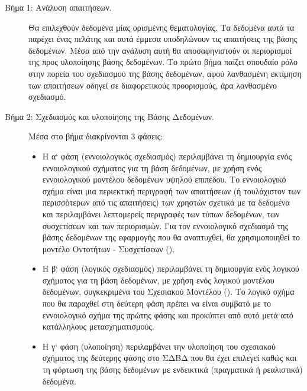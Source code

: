 \documentclass{assignment}
\begin{document}
\begin{description}

  \item [Βήμα 1: Ανάλυση απαιτήσεων.]  Θα επιλεχθούν δεδομένα μίας ορισμένης θεματολογίας. Τα δεδομένα αυτά τα παρέχει ένας πελάτης και αυτά έμμεσα υποδηλώνουν τις απαιτήσεις της βάσης δεδομένων. Μέσα από την ανάλυση αυτή θα αποσαφηνιστούν οι περιορισμοί της προς υλοποίησης βάσης δεδομένων. Το πρώτο βήμα παίζει σπουδαίο ρόλο στην πορεία του σχεδιασμού της βάσης δεδομένων, αφού λανθασμένη εκτίμηση των απαιτήσεων οδηγεί σε διαφορετικούς προορισμούς, άρα λανθασμένο σχεδιασμό. 

  \item [Βήμα 2: Σχεδιασμός και υλοποίησης της Βάσης Δεδομένων.] Μέσα στο βήμα διακρίνονται 3 φάσεις:

  \begin{itemize}

    \item Η α` φάση (εννοιολογικός σχεδιασμός) περιλαμβάνει τη δημιουργία ενός εννοιολογικού σχήματος για τη βάση δεδομένων, με χρήση ενός εννοιολογικού μοντέλου δεδομένων υψηλού επιπέδου. Το εννοιολογικό σχήμα είναι μια περιεκτική περιγραφή των απαιτήσεων (ή τουλάχιστον των περισσότερων από τις απαιτήσεις) των χρηστών σχετικά με τα δεδομένα και περιλαμβάνει λεπτομερείς περιγραφές των τύπων δεδομένων, των συσχετίσεων και των περιορισμών. Για τον εννοιολογικό σχεδιασμό της βάσης δεδομένων της εφαρμογής που θα αναπτυχθεί, θα χρησιμοποιηθεί το μοντέλο Οντοτήτων - Συσχετίσεων ().

    \item Η β` φάση (λογικός σχεδιασμός) περιλαμβάνει τη δημιουργία ενός λογικού σχήματος για τη βάση δεδομένων, με χρήση ενός λογικού μοντέλου δεδομένων, συγκεκριμένα του Σχεσιακού Μοντέλου (). Το λογικό σχήμα που θα παραχθεί στη δεύτερη φάση πρέπει να είναι συμβατό με το εννοιολογικό σχήμα της πρώτης φάσης και προκύπτει από αυτό μετά από κατάλληλους μετασχηματισμούς.

    \item Η γ` φάση (υλοποίηση) περιλαμβάνει την υλοποίηση του σχεσιακού σχήματος της δεύτερης φάσης στο ΣΔΒΔ που θα έχει επιλεγεί καθώς και τη φόρτωση της βάσης δεδομένων με ενδεικτικά (πραγματικά ή ρεαλιστικά) δεδομένα.

  \end{itemize}

\end{description}
\end{document}
